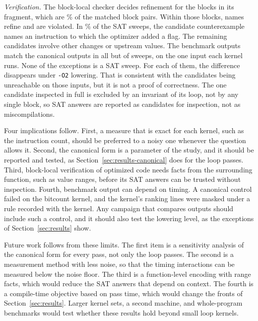 \emph{Verification.} The block-local checker decides refinement for the blocks in its fragment, which are \BlocksEncodablePct{}\% of
the matched block pairs. Within those blocks, \NamesRefine{} names refine and \NamesViolated{} are violated. In
\WitnessGainSweepsPct{}\% of the SAT sweeps, the candidate counterexample names an instruction to which the optimizer added a flag.
The remaining candidates involve other changes or upstream values. The benchmark outputs match the canonical outputs in all but
\OutputsDiffering{} of \OutputsChecked{} sweeps, on the one input each kernel runs. None of the exceptions is a SAT sweep. For each of them, the difference disappears under \texttt{-O2} lowering. That is consistent with the candidates being unreachable on those
inputs, but it is not a proof of correctness. The one candidate inspected in full is excluded by an invariant of its loop, not by any
single block, so SAT answers are reported as candidates for inspection, not as miscompilations.

Four implications follow. First, a measure that is exact for each kernel, such as the instruction count, should be preferred to a
noisy one whenever the question allows it. Second, the canonical form is a parameter of the study, and it should be reported and
tested, as Section~\ref{sec:results-canonical} does for the loop passes. Third, block-local verification of optimized code needs
facts from the surrounding function, such as value ranges, before its SAT answers can be trusted without inspection. Fourth,
benchmark output can depend on timing. A canonical control failed on the bitcount kernel, and the kernel's ranking lines were
masked under a rule recorded with the kernel. Any campaign that compares outputs should include such a control, and it should also
test the lowering level, as the exceptions of Section~\ref{sec:results} show.

Future work follows from these limits. The first item is a sensitivity analysis of the canonical form for every pass, not only the
loop passes. The second is a measurement method with less noise, so that the timing interactions can be measured below the noise
floor. The third is a function-level encoding with range facts, which would reduce the SAT answers that depend on context. The
fourth is a compile-time objective based on pass time, which would change the fronts of Section~\ref{sec:results}. Larger kernel
sets, a second machine, and whole-program benchmarks would test whether these results hold beyond small loop kernels.


